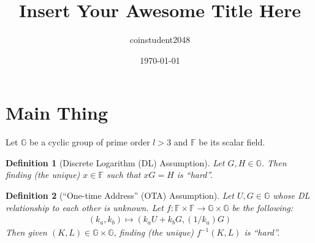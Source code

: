 \documentclass{article}
\title{Insert Your Awesome Title Here}
\author{coinstudent2048}
\date{\today}
\newtheorem{definition}{Definition}[section]
\begin{document}
\maketitle


\section{Main Thing}
\noindent Let $\mathbb{G}$ be a cyclic group of prime order $l>3$ and $\mathbb{F}$ be its scalar field.

\begin{definition}[Discrete Logarithm (DL) Assumption]
Let $G, H\in\mathbb{G}$. Then finding (the unique) $x\in\mathbb{F}$ such that $xG=H$ is ``hard''.
\end{definition}

\begin{definition}[``One-time Address'' (OTA) Assumption]
Let $U, G\in\mathbb{G}$ whose DL relationship to each other is unknown. Let $f:\mathbb{F}\times\mathbb{F}\rightarrow\mathbb{G}\times\mathbb{G}$ be the following:
\begin{align*}
    (k_a, k_b) \mapsto (k_a U + k_b G, (1/k_a)G)
\end{align*}
Then given $(K, L)\in\mathbb{G}\times\mathbb{G}$, finding (the unique) $f^{-1}(K,L)$ is ``hard''.
\end{definition}
\end{document}
